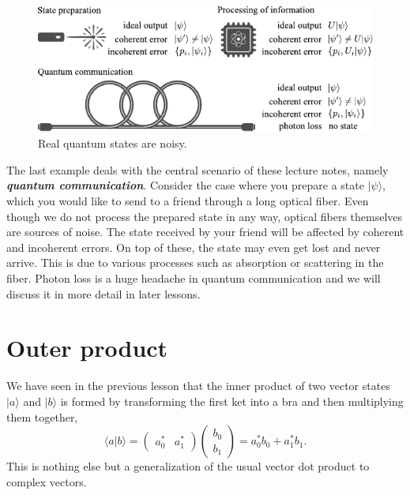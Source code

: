 \begin{figure}[t]
    \centering
    \includegraphics[width=\textwidth]{lesson3/3-1_noise.pdf}
    \caption[Noisy world]{Real quantum states are noisy.}
    \label{fig:3-1_noise}
\end{figure}

The last example deals with the central scenario of these lecture notes, namely \textit{\textbf{quantum communication}}.
Consider the case where you prepare a state $|\psi\rangle$, which you would like to send to a friend through a long optical fiber.
Even though we do not process the prepared state in any way, optical fibers themselves are sources of noise.
The state received by your friend will be affected by coherent and incoherent errors.
On top of these, the state may even get lost and never arrive.
This is due to various processes such as absorption or scattering in the fiber.
Photon loss is a huge headache in quantum communication and we will discuss it in more detail in later lessons.





\section{Outer product}
\label{sec:3-2_outer_product}

We have seen in the previous lesson that the inner product of two vector states $|a\rangle$ and $|b\rangle$ is formed by transforming the first ket into a bra and then multiplying them together,
\begin{equation}
    \langle a | b\rangle = \begin{pmatrix} a_0^* & a_1^* \end{pmatrix} \begin{pmatrix} b_0 \\ b_1 \end{pmatrix} = a_0^* b_0 + a_1^* b_1.
\end{equation}
This is nothing else but a generalization of the usual vector dot product to complex vectors.

